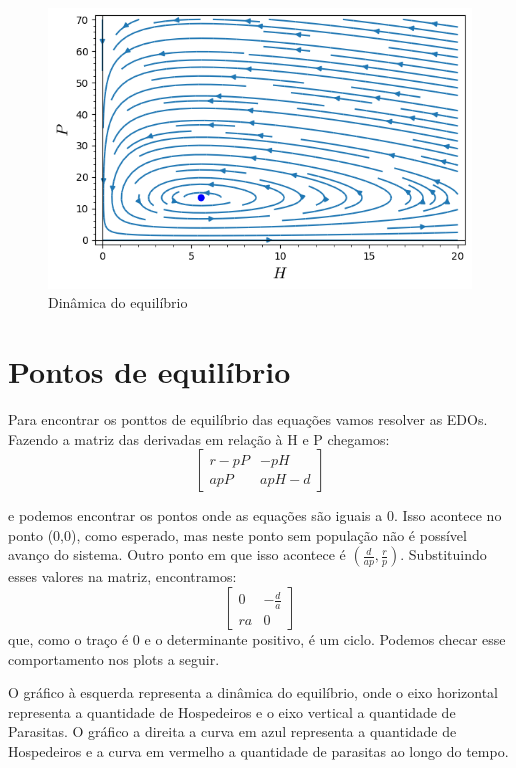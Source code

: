 \begin{figure}[h!]
            \centering
            \includegraphics{Img/Plot example.png}
            \caption{Dinâmica do equilíbrio}
        \end{figure}
        
\newpage

\section{Pontos de equilíbrio}

Para encontrar os ponttos de equilíbrio das equações vamos resolver as EDOs. Fazendo a matriz das derivadas em relação à H e P chegamos:
$$\begin{bmatrix}
	r -pP & -pH\\
	apP & apH-d
	\end{bmatrix}$$
	
	e podemos encontrar os pontos onde as equações são iguais a 0. Isso acontece no ponto (0,0), como esperado, mas neste ponto sem população não é possível avanço do sistema. Outro ponto em que isso acontece é $(\frac{d}{ap}, \frac{r}{p})$. Substituindo esses valores na matriz, encontramos:
	$$\begin{bmatrix}
	0 & -\frac{d}{a}\\
	ra & 0
	\end{bmatrix}$$
	que, como o traço é 0 e o determinante positivo, é um ciclo. Podemos checar esse comportamento nos plots a seguir.
	
	O gráfico à esquerda representa a dinâmica do equilíbrio, onde o eixo horizontal representa a quantidade de Hospedeiros e o eixo vertical a quantidade de Parasitas. O gráfico a direita a curva em azul representa a quantidade de Hospedeiros e a curva em vermelho a quantidade de parasitas ao longo do tempo.
	
